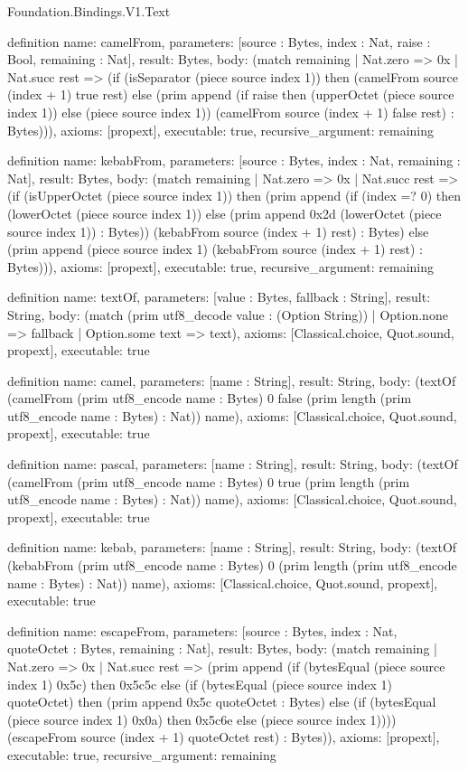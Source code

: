 \begin{lexlean}{Foundation.Bindings.V1.Text}
\begin{semanticmodule}
definition{
  name: camelFrom,
  parameters: [source : Bytes, index : Nat, raise : Bool, remaining : Nat],
  result: Bytes,
  body: (match remaining
    | Nat.zero => 0x
    | Nat.succ rest => (if (isSeparator (piece source index 1)) then (camelFrom source (index + 1) true rest) else (prim append (if raise then (upperOctet (piece source index 1)) else (piece source index 1)) (camelFrom source (index + 1) false rest) : Bytes))),
  axioms: [propext],
  executable: true,
  recursive_argument: remaining
}

definition{
  name: kebabFrom,
  parameters: [source : Bytes, index : Nat, remaining : Nat],
  result: Bytes,
  body: (match remaining
    | Nat.zero => 0x
    | Nat.succ rest => (if (isUpperOctet (piece source index 1)) then (prim append (if (index =? 0) then (lowerOctet (piece source index 1)) else (prim append 0x2d (lowerOctet (piece source index 1)) : Bytes)) (kebabFrom source (index + 1) rest) : Bytes) else (prim append (piece source index 1) (kebabFrom source (index + 1) rest) : Bytes))),
  axioms: [propext],
  executable: true,
  recursive_argument: remaining
}

definition{
  name: textOf,
  parameters: [value : Bytes, fallback : String],
  result: String,
  body: (match (prim utf8_decode value : (Option String))
    | Option.none => fallback
    | Option.some text => text),
  axioms: [Classical.choice, Quot.sound, propext],
  executable: true
}

definition{
  name: camel,
  parameters: [name : String],
  result: String,
  body: (textOf (camelFrom (prim utf8_encode name : Bytes) 0 false (prim length (prim utf8_encode name : Bytes) : Nat)) name),
  axioms: [Classical.choice, Quot.sound, propext],
  executable: true
}

definition{
  name: pascal,
  parameters: [name : String],
  result: String,
  body: (textOf (camelFrom (prim utf8_encode name : Bytes) 0 true (prim length (prim utf8_encode name : Bytes) : Nat)) name),
  axioms: [Classical.choice, Quot.sound, propext],
  executable: true
}

definition{
  name: kebab,
  parameters: [name : String],
  result: String,
  body: (textOf (kebabFrom (prim utf8_encode name : Bytes) 0 (prim length (prim utf8_encode name : Bytes) : Nat)) name),
  axioms: [Classical.choice, Quot.sound, propext],
  executable: true
}

definition{
  name: escapeFrom,
  parameters: [source : Bytes, index : Nat, quoteOctet : Bytes, remaining : Nat],
  result: Bytes,
  body: (match remaining
    | Nat.zero => 0x
    | Nat.succ rest => (prim append (if (bytesEqual (piece source index 1) 0x5c) then 0x5c5c else (if (bytesEqual (piece source index 1) quoteOctet) then (prim append 0x5c quoteOctet : Bytes) else (if (bytesEqual (piece source index 1) 0x0a) then 0x5c6e else (piece source index 1)))) (escapeFrom source (index + 1) quoteOctet rest) : Bytes)),
  axioms: [propext],
  executable: true,
  recursive_argument: remaining
}


\end{semanticmodule}
\end{lexlean}
